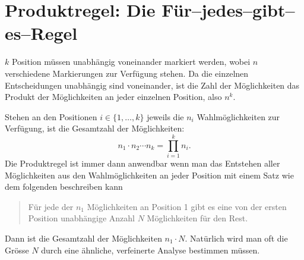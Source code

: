 \section{Produktregel: Die Für--jedes--gibt--es--Regel}
\label{kombinatorik-produktregel}
$k$ Position müssen unabhängig voneinander markiert werden, wobei
$n$ verschiedene Markierungen zur Verfügung stehen.
Da die einzelnen
Entscheidungen unabhängig sind voneinander, ist die Zahl der Möglichkeiten
das Produkt der Möglichkeiten an jeder einzelnen Position, also
$n^k$.

Stehen an den Positionen $i\in\{1,\dots,k\}$ jeweils die $n_i$
Wahlmöglichkeiten
zur Verfügung, ist die Gesamtzahl der Möglichkeiten:
\[
n_1\cdot n_2\dotsm n_k=\prod_{i=1}^kn_i.
\]
Die Produktregel ist immer dann anwendbar wenn man das Entstehen
aller Möglichkeiten aus den Wahlmöglichkeiten an jeder Position
mit einem Satz wie dem folgenden beschreiben kann
\begin{quote}
Für jede der $n_1$ Möglichkeiten an Position 1 gibt es eine
von der ersten Position unabhängige
Anzahl $N$ Möglichkeiten für den Rest.
\end{quote}
Dann ist die Gesamtzahl der Möglichkeiten $n_1\cdot N$. 
Natürlich wird man oft die Grösse $N$ durch eine ähnliche,
verfeinerte Analyse bestimmen müssen.

